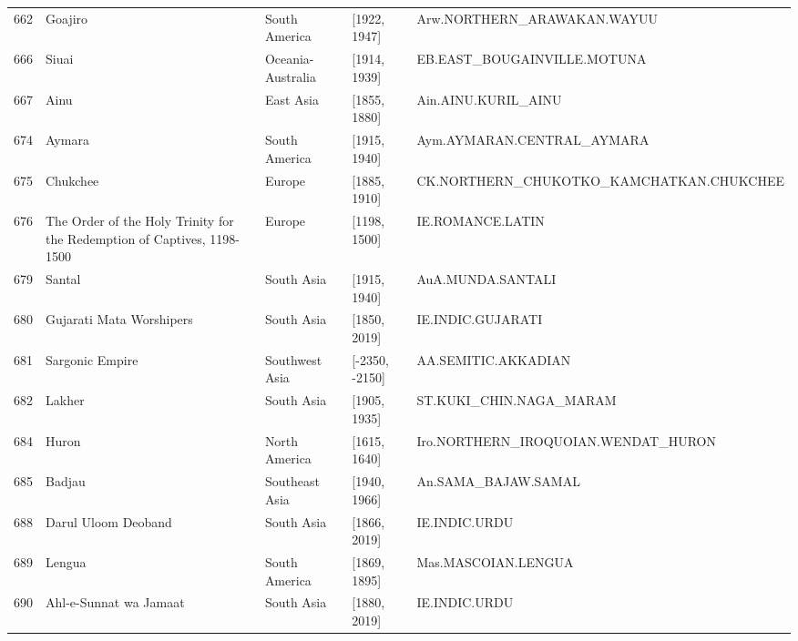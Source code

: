 {\begin{longtable}{rp{3.5cm}llp{3.5cm}}
662 & {\raggedright Goajiro} & South America & [1922, 1947] & {\raggedright Arw.\allowbreak{}NORTHERN\_\allowbreak{}ARAWAKAN.\allowbreak{}WAYUU} \\
666 & {\raggedright Siuai} & Oceania-Australia & [1914, 1939] & {\raggedright EB.\allowbreak{}EAST\_\allowbreak{}BOUGAINVILLE.\allowbreak{}MOTUNA} \\
667 & {\raggedright Ainu} & East Asia & [1855, 1880] & {\raggedright Ain.\allowbreak{}AINU.\allowbreak{}KURIL\_\allowbreak{}AINU} \\
674 & {\raggedright Aymara} & South America & [1915, 1940] & {\raggedright Aym.\allowbreak{}AYMARAN.\allowbreak{}CENTRAL\_\allowbreak{}AYMARA} \\
675 & {\raggedright Chukchee} & Europe & [1885, 1910] & {\raggedright CK.\allowbreak{}NORTHERN\_\allowbreak{}CHUKOTKO\_\allowbreak{}KAMCHATKAN.\allowbreak{}CHUKCHEE} \\
676 & {\raggedright The Order of the Holy Trinity for the Redemption of Captives, 1198-1500} & Europe & [1198, 1500] & {\raggedright IE.\allowbreak{}ROMANCE.\allowbreak{}LATIN} \\
679 & {\raggedright Santal} & South Asia & [1915, 1940] & {\raggedright AuA.\allowbreak{}MUNDA.\allowbreak{}SANTALI} \\
680 & {\raggedright Gujarati Mata Worshipers} & South Asia & [1850, 2019] & {\raggedright IE.\allowbreak{}INDIC.\allowbreak{}GUJARATI} \\
681 & {\raggedright Sargonic Empire} & Southwest Asia & [-2350, -2150] & {\raggedright AA.\allowbreak{}SEMITIC.\allowbreak{}AKKADIAN} \\
682 & {\raggedright Lakher} & South Asia & [1905, 1935] & {\raggedright ST.\allowbreak{}KUKI\_\allowbreak{}CHIN.\allowbreak{}NAGA\_\allowbreak{}MARAM} \\
684 & {\raggedright Huron} & North America & [1615, 1640] & {\raggedright Iro.\allowbreak{}NORTHERN\_\allowbreak{}IROQUOIAN.\allowbreak{}WENDAT\_\allowbreak{}HURON} \\
685 & {\raggedright Badjau} & Southeast Asia & [1940, 1966] & {\raggedright An.\allowbreak{}SAMA\_\allowbreak{}BAJAW.\allowbreak{}SAMAL} \\
688 & {\raggedright Darul Uloom Deoband} & South Asia & [1866, 2019] & {\raggedright IE.\allowbreak{}INDIC.\allowbreak{}URDU} \\
689 & {\raggedright Lengua} & South America & [1869, 1895] & {\raggedright Mas.\allowbreak{}MASCOIAN.\allowbreak{}LENGUA} \\
690 & {\raggedright Ahl-e-Sunnat wa Jamaat} & South Asia & [1880, 2019] & {\raggedright IE.\allowbreak{}INDIC.\allowbreak{}URDU} \\

\end{longtable}}
